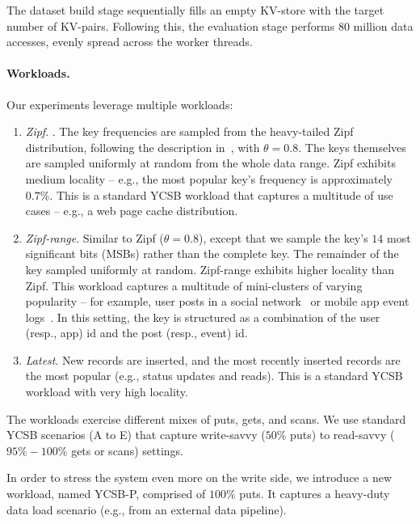 The dataset build stage sequentially fills an empty KV-store with the target number of KV-pairs. Following this, 
the evaluation stage performs 80 million data accesses, evenly spread across the worker threads.   

\paragraph{Workloads.} 

Our experiments leverage multiple workloads: 

\begin{enumerate}
\item {\em Zipf}. . The key frequencies are sampled from the heavy-tailed Zipf distribution, 
following the description in~\cite{?}, with $\theta = 0.8$. The keys themselves are sampled 
uniformly at random from the whole data range. Zipf exhibits medium locality -- e.g., the most 
popular key's frequency is approximately $0.7\%$. This is a standard YCSB workload that captures
a multitude of use cases -- e.g., a web page cache distribution. 

\item {\em Zipf-range}. Similar to Zipf ($\theta=0.8$), except that we sample the key's $14$ most significant bits
(MSBs) rather than the complete key. The remainder of the key sampled uniformly at random. Zipf-range exhibits
higher locality than Zipf. This workload captures a multitude of mini-clusters of varying popularity -- 
for example, user posts in a social network~\cite{linkbench} or mobile app event logs~\cite{flurry}. 
In this setting, the key is structured as a combination of the user (resp., app) id and the post (resp., event) id. 

\item {\em Latest}. New records are inserted, and the most recently inserted records are the 
most popular (e.g., status updates and reads). This is a standard YCSB workload with very high 
locality. 
\end{enumerate}

The workloads exercise different mixes of puts, gets, and scans. We use standard YCSB scenarios 
(A to E) that capture write-savvy ($50\%$ puts) to read-savvy ($95\%-100\%$ gets or scans) settings. 

In order to stress the system even more on the write side, we introduce a new workload, named 
YCSB-P, comprised of $100\%$ puts. It captures a heavy-duty data load scenario (e.g., from an 
external data pipeline). 

